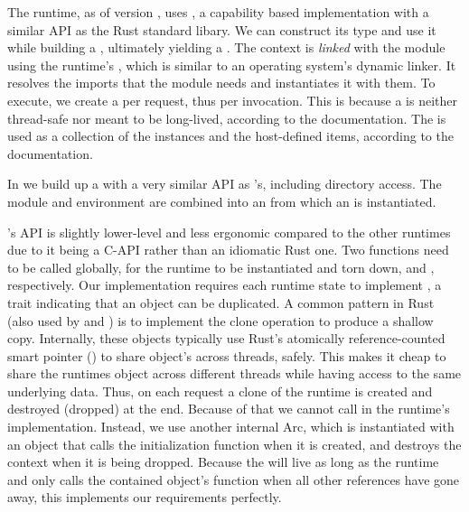 \begin{description}[style=multiline, leftmargin=2.5cm, font=\bfseries]

    \item[Wasmtime] The  runtime, as of version , uses , a capability based implementation with a similar API as the Rust standard libary. We can construct its  type and use it while building a , ultimately yielding a . The context is \emph{linked} with the module using the runtime's , which is similar to an operating system's dynamic linker. It resolves the imports that the module needs and instantiates it with them.
          To execute, we create a  per request, thus per  invocation. This is because a  is neither thread-safe nor meant to be long-lived, according to the documentation. The  is used as a collection of the instances and the host-defined items, according to the documentation.

    \item[Wasmer] In  we build up a  with a very similar API as 's, including directory access. The module and environment are combined into an  from which an  is instantiated.

    \item[Wamr] 's API is slightly lower-level and less ergonomic compared to the other runtimes due to it being a C-API rather than an idiomatic Rust one.
          Two functions need to be called globally, for the runtime to be instantiated and torn down,  and , respectively.
          Our implementation requires each runtime state to implement , a trait indicating that an object can be duplicated. A common pattern in Rust (also used by  and ) is to implement the clone operation to produce a shallow copy. Internally, these objects typically use Rust's atomically reference-counted smart pointer () to share object's across threads, safely. This makes it cheap to share the runtimes object across different threads while having access to the same underlying data. Thus, on each request a clone of the runtime is created and destroyed (dropped) at the end. Because of that we cannot call  in the runtime's  implementation. Instead, we use another internal Arc, which is instantiated with an object that calls the initialization function when it is created, and destroys the context when it is being dropped. Because the  will live as long as the runtime and only calls the contained object's  function when all other references have gone away, this implements our requirements perfectly.

\end{description}

